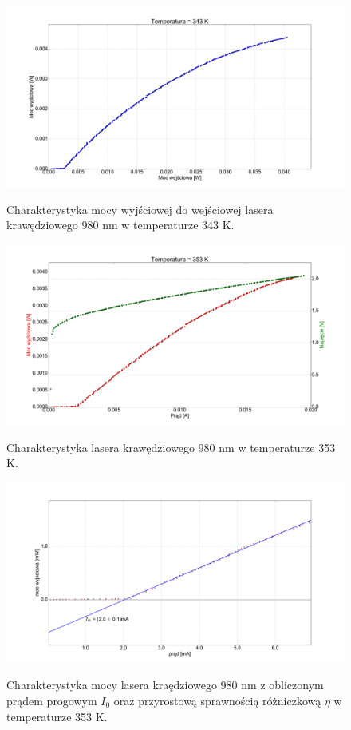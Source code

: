 \documentclass[a4paper, portrait,12pt]{report}
\begin{document}
\begin{figure}
\center
  \includegraphics[scale=0.30]{plot980/temp_70_power.png}
  \label{rys1}
  \caption{Charakterystyka mocy wyjściowej do wejściowej lasera krawędziowego 980 nm w temperaturze 343 K.} 
\end{figure}


\begin{figure}
\center
  \includegraphics[scale=0.30]{plot980/temp_80_IVL.png}
  \label{rys1}
  \caption{Charakterystyka lasera krawędziowego 980 nm w temperaturze 353 K.} 
\end{figure}

\begin{figure}
\center
  \includegraphics[scale=0.30]{plot980/temp_80_fit.png}
  \label{rys1}
  \caption{Charakterystyka mocy lasera kraędziowego 980 nm z obliczonym prądem progowym $I_0$ oraz przyrostową sprawnością różniczkową $\eta$ w temperaturze 353 K.} 
\end{figure}
\end{document}
